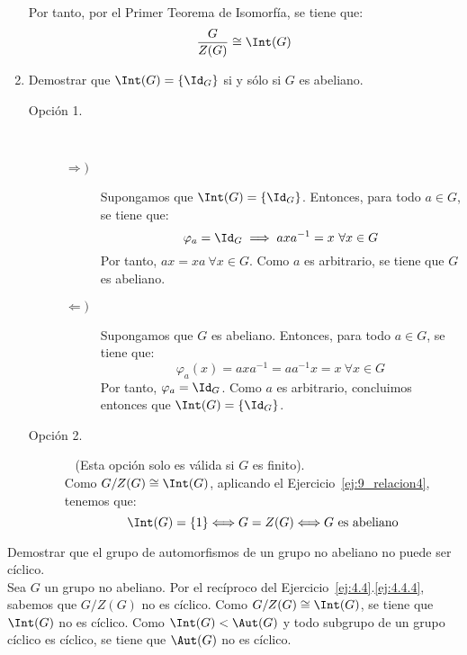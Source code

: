 \begin{ejercicio}
\begin{enumerate}
        Por tanto, por el Primer Teorema de Isomorfía, se tiene que:
        \begin{equation*}
            \dfrac{G}{Z(G)}\cong \Int(G)
        \end{equation*}
        \item Demostrar que $\Int(G)=\{\Id_G\}$ si y sólo si $G$ es abeliano.
            \begin{description}
                \item [Opción 1.]~
                \begin{description}
                    \item[$\Longrightarrow)$] Supongamos que $\Int(G)=\{\Id_G\}$. Entonces, para todo $a\in G$, se tiene que:
                    \begin{equation*}
                        \varphi_a = \Id_G \implies axa^{-1} = x\ \forall x\in G
                    \end{equation*}
                    Por tanto, $ax=xa\ \forall x\in G$. Como $a$ es arbitrario, se tiene que $G$ es abeliano.
                    \item[$\Longleftarrow)$] Supongamos que $G$ es abeliano. Entonces, para todo $a\in G$, se tiene que:
                    \begin{equation*}
                        \varphi_a(x) = axa^{-1} = aa^{-1}x = x\ \forall x\in G
                    \end{equation*}
                    Por tanto, $\varphi_a = \Id_G$. Como $a$ es arbitrario, concluimos entonces que $\Int(G)=\{\Id_G\}$.
                \end{description}
                \item [Opción 2.]~ (Esta opción solo es válida si $G$ es finito).\\
                    Como $G/Z(G)\cong \Int(G)$, aplicando el Ejercicio~\ref{ej:9_relacion4}, tenemos que:
                    \begin{equation*}
                        \Int(G) = \{1\} \Longleftrightarrow G = Z(G) \Longleftrightarrow G \text{\ es abeliano}
                    \end{equation*}
            \end{description}
    \end{enumerate}
\end{ejercicio}

\begin{ejercicio}
    Demostrar que el grupo de automorfismos de un grupo no abeliano no puede ser cíclico.\\

    Sea $G$ un grupo no abeliano. Por el recíproco del Ejercicio~\ref{ej:4.4}.\ref{ej:4.4.4}, sabemos que $G/Z(G)$ no es cíclico. Como $G/Z(G)\cong \Int(G)$, se tiene que $\Int(G)$ no es cíclico. Como $\Int(G)< \Aut(G)$ y todo subgrupo de un grupo cíclico es cíclico, se tiene que $\Aut(G)$ no es cíclico.
\end{ejercicio}

